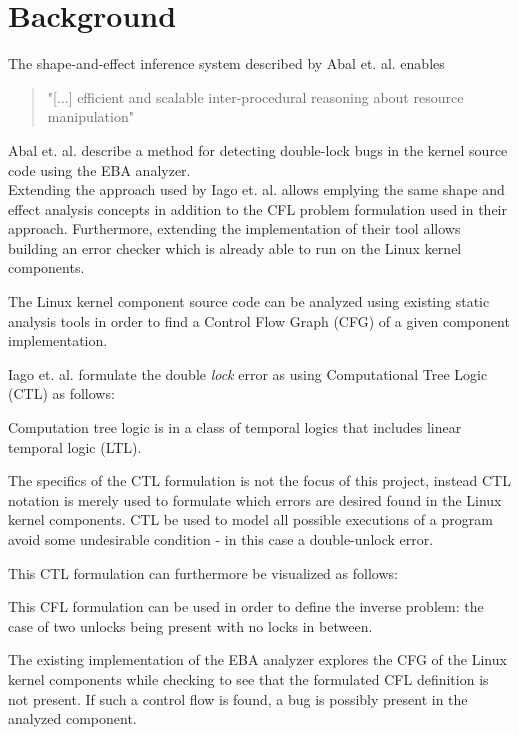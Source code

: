 \section{Background}

The shape-and-effect inference system described by Abal et. al. \cite{Abal2017EffectiveBF} enables \begin{quote}
    "[...] efficient and scalable inter-procedural reasoning about resource manipulation"
\end{quote}
 
\noindent Abal et. al. describe a method for detecting double-lock bugs in the kernel source code using the EBA analyzer. \\

\noindent Extending the approach used by Iago et. al. allows emplying the same shape and effect analysis concepts in addition to the CFL problem formulation used in their approach. Furthermore, extending the implementation of their tool allows building an error checker which is already able to run on the Linux kernel components. 

\noindent The Linux kernel component source code can be analyzed using existing static analysis tools in order to find a Control Flow Graph (CFG) of a given component implementation. 



\noindent Iago et. al. formulate the double \textit{lock} error as using Computational Tree Logic (CTL) as follows: 


\noindent Computation tree logic is in a class of temporal logics that includes linear temporal logic (LTL). 


The specifics of the CTL formulation is not the focus of this project, instead CTL notation is merely used to formulate which errors are desired found in the Linux kernel components. 
CTL be used to model all possible executions of a program avoid some undesirable condition - in this case a double-unlock error. 


\noindent This CTL formulation can furthermore be visualized as follows: 


\noindent This CFL formulation can be used in order to define the inverse problem: the case of two unlocks being present with no locks in between. 


\noindent The existing implementation of the EBA analyzer explores the CFG of the Linux kernel components while checking to see that the formulated CFL definition is not present. If such a control flow is found, a bug is possibly present in the analyzed component. 